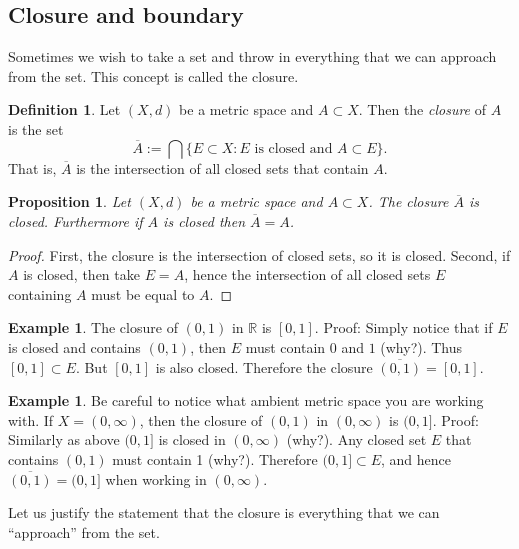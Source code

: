 \documentclass[12pt]{book}
\newcommand{\R}{{\mathbb{R}}}
\newcommand{\myindex}[1]{#1\index{#1}}
\theoremstyle{plain}
\newtheorem{prop}[thm]{Proposition}
\theoremstyle{remark}
\theoremstyle{definition}
\newtheorem{defn}[thm]{Definition}
\theoremstyle{exercise}
\theoremstyle{example}
\newtheorem{example}[thm]{Example}
\begin{document}
\subsection{Closure and boundary}

Sometimes we wish to take a set and throw in everything that we can approach
from the set.  This concept is called the closure.

\begin{defn}
Let $(X,d)$ be a metric space and $A \subset X$.  Then
the \emph{\myindex{closure}} of $A$ is the set
\begin{equation*}
\overline{A} := \bigcap \{ E \subset X : \text{$E$ is closed and $A \subset
E$} \} .
\end{equation*}
That is, $\overline{A}$ is the intersection of all closed sets that contain
$A$.
\end{defn}

\begin{prop}
Let $(X,d)$ be a metric space and $A \subset X$.  The closure $\overline{A}$
is closed.  Furthermore if $A$ is closed then $\overline{A} = A$.
\end{prop}

\begin{proof}
First, the closure is the intersection of closed sets, so it is closed.
Second, if $A$ is closed, then take $E = A$, hence the intersection of all
closed sets $E$ containing $A$ must be equal to $A$.
\end{proof}

\begin{example}
The closure of $(0,1)$ in $\R$ is $[0,1]$.  Proof:  Simply notice that if
$E$ is closed and contains $(0,1)$, then $E$ must contain $0$ and $1$ (why?).
Thus $[0,1] \subset E$.  But $[0,1]$ is also closed.
Therefore the closure $\overline{(0,1)} = [0,1]$.
\end{example}

\begin{example}
Be careful to notice what ambient metric space you are working with.
If $X = (0,\infty)$, then
the closure of $(0,1)$ in $(0,\infty)$ is $(0,1]$.  Proof:  Similarly as
above $(0,1]$ is closed in $(0,\infty)$ (why?).  Any closed set $E$
that contains $(0,1)$ must contain 1 (why?).  Therefore $(0,1] \subset E$,
and hence $\overline{(0,1)} = (0,1]$ when working in $(0,\infty)$.
\end{example}

Let us justify the statement that the closure is everything that we can
``approach'' from the set.
\end{document}

